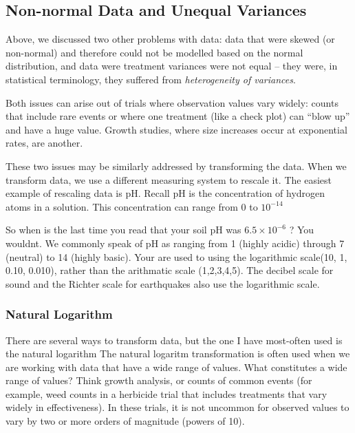 \documentclass[
]{book}
\begin{document}
\hypertarget{non-normal-data-and-unequal-variances}{%
\subsection{Non-normal Data and Unequal Variances}\label{non-normal-data-and-unequal-variances}}

Above, we discussed two other problems with data: data that were skewed (or non-normal) and therefore could not be modelled based on the normal distribution, and data were treatment variances were not equal -- they were, in statistical terminology, they suffered from \emph{heterogeneity of variances}.

Both issues can arise out of trials where observation values vary widely: counts that include rare events or where one treatment (like a check plot) can ``blow up'' and have a huge value. Growth studies, where size increases occur at exponential rates, are another.

These two issues may be similarly addressed by transforming the data. When we transform data, we use a different measuring system to rescale it. The easiest example of rescaling data is pH. Recall pH is the concentration of hydrogen atoms in a solution. This concentration can range from \(0\) to \(10^{-14}\)

So when is the last time you read that your soil pH was \(6.5 \times 10^{-6}\) ? You wouldnt. We commonly speak of pH as ranging from 1 (highly acidic) through 7 (neutral) to 14 (highly basic). Your are used to using the logarithmic scale(10, 1, 0.10, 0.010), rather than the arithmatic scale (1,2,3,4,5). The decibel scale for sound and the Richter scale for earthquakes also use the logarithmic scale.

\hypertarget{natural-logarithm}{%
\subsubsection{Natural Logarithm}\label{natural-logarithm}}

There are several ways to transform data, but the one I have most-often used is the natural logarithm
The natural logaritm transformation is often used when we are working with data that have a wide range of values. What constitutes a wide range of values? Think growth analysis, or counts of common events (for example, weed counts in a herbicide trial that includes treatments that vary widely in effectiveness). In these trials, it is not uncommon for observed values to vary by two or more orders of magnitude (powers of 10).
\end{document}
